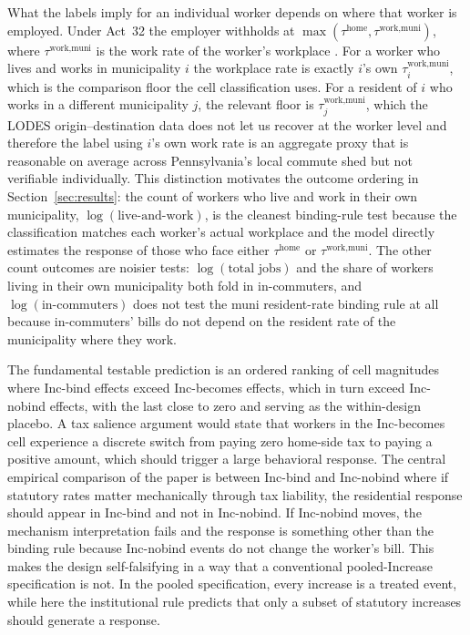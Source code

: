 \documentclass[12pt]{article}
\begin{document}
What the labels imply for an individual worker depends on where
that worker is employed. Under Act~32 the employer withholds at
$\max(\tau^{\text{home}}, \tau^{\text{work,muni}})$, where
$\tau^{\text{work,muni}}$ is the work rate of the
worker's workplace \citep{paAct32_2008, bagchiEffectsIntroducingWithholding2022}. For a worker who lives and works in
municipality $i$ the workplace rate is exactly $i$'s
own $\tau^{\text{work,muni}}_i$, which is the comparison floor the cell
classification uses. For a resident of $i$ who works in a different
municipality $j$, the relevant floor is $\tau^{\text{work,muni}}_j$,
which the LODES origin--destination data does not let us recover at
the worker level and therefore the label using $i$'s own
work rate is an aggregate proxy that is reasonable on
average across Pennsylvania's local commute shed but not verifiable
individually. This distinction motivates the outcome ordering in
Section~\ref{sec:results}: the count of workers who live and work
in their own municipality, $\log(\text{live-and-work})$, is the
cleanest binding-rule test because the classification matches each
worker's actual workplace and the model directly estimates the response of those who face either $\tau^{\text{home}}$ or $\tau^{\text{work,muni}}$. The other count outcomes are noisier tests: $\log(\text{total jobs})$ and the share of workers living in their own municipality both fold in in-commuters, and $\log(\text{in-commuters})$
does not test the muni resident-rate binding rule at all because
in-commuters' bills do not depend on the resident rate of the
municipality where they work.

The fundamental testable prediction is an
ordered ranking of cell magnitudes where Inc-bind effects exceed
Inc-becomes effects, which in turn exceed Inc-nobind effects, with
the last close to zero and serving as the
within-design placebo. A tax salience argument would state that workers in the Inc-becomes cell
experience a discrete switch from paying zero home-side tax to
paying a positive amount, which should trigger a large behavioral response. The
central empirical comparison of the paper is between Inc-bind and
Inc-nobind where if statutory rates matter mechanically through tax
liability, the residential response should appear in Inc-bind and
not in Inc-nobind. If Inc-nobind moves, the mechanism
interpretation fails and the response is something other than the
binding rule because Inc-nobind events do not change the worker's
bill. This makes the design self-falsifying in a way that a
conventional pooled-Increase specification is not. In the pooled
specification, every increase is a treated event, while here the
institutional rule predicts that only a subset of statutory
increases should generate a response.
\end{document}
